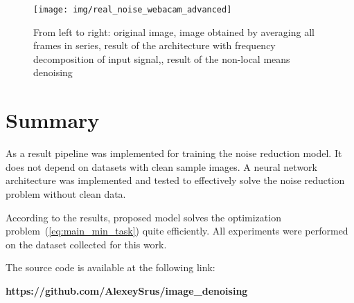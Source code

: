 \documentclass[runningheads]{llncs}
\begin{document}
\begin{figure}
	\centering
	\texttt{[image: img/real\_noise\_webacam\_advanced]}
	\caption{From left to right: original image, image obtained by averaging all frames in series, result of the architecture with frequency decomposition of input signal,, result of the non-local means denoising}
	\label{fig:real_noise_webacam_advanced}
\end{figure}

\section{Summary}
As a result pipeline was implemented for training the noise reduction model. It does not depend on datasets with clean sample images.
A neural network architecture was implemented and tested to effectively solve the noise reduction problem without clean data.

According to the results, proposed model solves the optimization problem~(\ref{eq:main_min_task}) quite efficiently. All experiments were performed on the dataset collected for this work.

The source code is available at the following link:

\textbf{https://github.com/AlexeySrus/image\_denoising}
\end{document}
